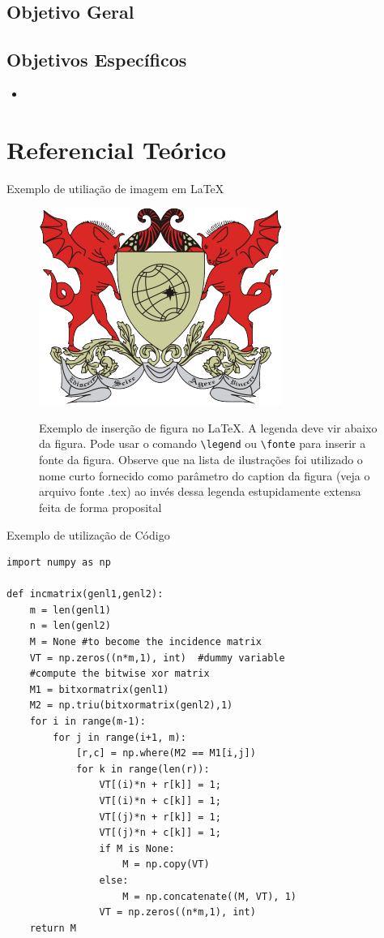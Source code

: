 \documentclass[
	12pt, %
	openright, %
	oneside, %
	a4paper, %
  sumario=tradicional, %
	english, %
	brazil, %
]{abntex2} %
\begin{document}
\section{Objetivo Geral}

\section{Objetivos Específicos}
\begin{itemize}
    \item 
\end{itemize}

\chapter{Referencial Teórico}\label{sec:RefTeorico}
Exemplo de utiliação de imagem em \LaTeX
\begin{figure}[htbp]
    \begin{center}
    \includegraphics[width=.5\linewidth]{assets/LogoUFV}\\
    \end{center}
    \caption[Exemplo de Figura]{Exemplo de inserção de figura no \LaTeX. A legenda deve vir abaixo da figura. Pode usar o comando \texttt{\textbackslash legend} ou \texttt{\textbackslash fonte} para inserir a fonte da figura. Observe que na lista de ilustrações foi utilizado o nome curto fornecido como parâmetro do caption da figura (veja o arquivo fonte .tex) ao invés dessa legenda estupidamente extensa feita de forma proposital}
    \label{fig:logo}
  \end{figure}

Exemplo de utilização de Código
\begin{verbatim}
import numpy as np

def incmatrix(genl1,genl2):
    m = len(genl1)
    n = len(genl2)
    M = None #to become the incidence matrix
    VT = np.zeros((n*m,1), int)  #dummy variable
    #compute the bitwise xor matrix
    M1 = bitxormatrix(genl1)
    M2 = np.triu(bitxormatrix(genl2),1) 
    for i in range(m-1):
        for j in range(i+1, m):
            [r,c] = np.where(M2 == M1[i,j])
            for k in range(len(r)):
                VT[(i)*n + r[k]] = 1;
                VT[(i)*n + c[k]] = 1;
                VT[(j)*n + r[k]] = 1;
                VT[(j)*n + c[k]] = 1;
                if M is None:
                    M = np.copy(VT)
                else:
                    M = np.concatenate((M, VT), 1)
                VT = np.zeros((n*m,1), int)
    return M
\end{verbatim}
\end{document}
